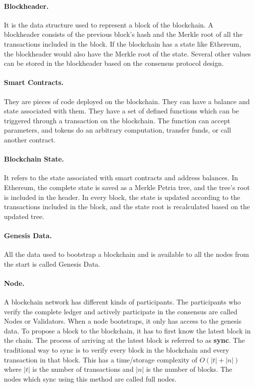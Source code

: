 \documentclass[a4paper,11pt,oneside]{article}
\theoremstyle{definition}
\begin{document}
  \paragraph{Blockheader.} It is the data structure used to represent a block of the blockchain. A blockheader consists of the previous block's hash and the Merkle root of all the transactions included in the block. If the blockchain has a state like Ethereum, the blockheader would also have the Merkle root of the state\cite{EthereumYellowPaper, Ethereum}. Several other values can be stored in the blockheader based on the consensus protocol design.    
  
  \paragraph{Smart Contracts.} They are pieces of code deployed on the blockchain. They can have a balance and state associated with them. They have a set of defined functions which can be triggered through a transaction on the blockchain. The function can accept parameters, and tokens do an arbitrary computation, transfer funds, or call another contract.
  
  \paragraph{Blockchain State.} It refers to the state associated with smart contracts and address balances. In Ethereum, the complete state is saved as a Merkle Petria tree, and the tree's root is included in the header. In every block, the state is updated according to the transactions included in the block, and the state root is recalculated based on the updated tree.
  
  \paragraph{Genesis Data.} All the data used to bootstrap a blockchain and is available to all the nodes from the start is called Genesis Data.  
  
  \paragraph{Node.} A blockchain network has different kinds of participants. The participants who verify the complete ledger and actively participate in the consensus are called Nodes or Validators. When a node bootstraps, it only has access to the genesis data. To propose a block to the blockchain, it has to first know the latest block in the chain. The process of arriving at the latest block is referred to as \textbf{sync}. The traditional way to sync is to verify every block in the blockchain and every transaction in that block. This has a time/storage complexity of $O(|t| + |n|)$ where $|t|$ is the number of transactions and $|n|$ is the number of blocks. The nodes which sync using this method are called full nodes.
   
\end{document}
